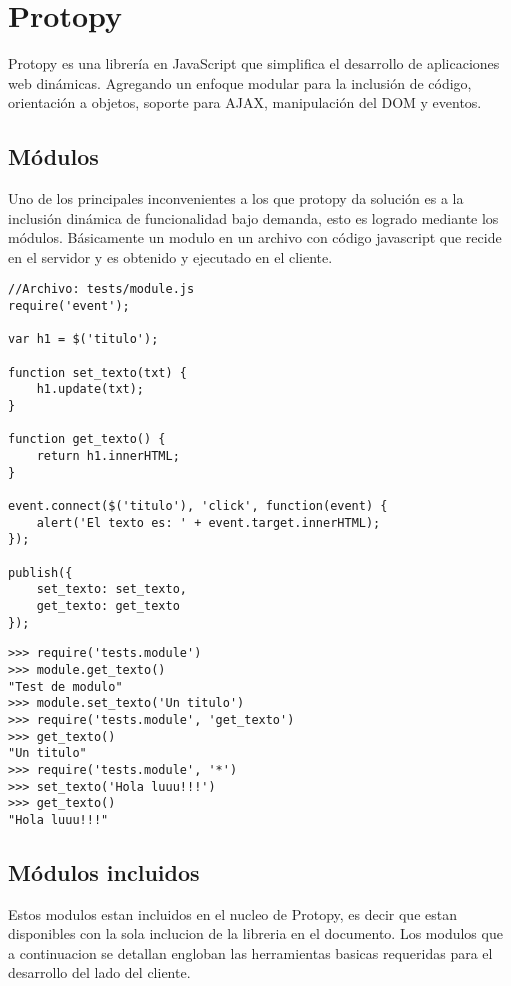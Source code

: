 \chapter{Protopy}
Protopy es una librería en JavaScript que simplifica el desarrollo de
aplicaciones web dinámicas.
Agregando un enfoque modular para la inclusión de código, orientación a objetos,
soporte para AJAX, manipulación del DOM y eventos.

\section{Módulos}
Uno de los principales inconvenientes a los que protopy da solución es a la
inclusión dinámica de funcionalidad bajo demanda,
esto es logrado mediante los módulos.
Básicamente un modulo en un archivo con código javascript que recide en el
servidor y es obtenido y ejecutado en el cliente.

\begin{lstlisting}[style=javascript,label=estructura-modulo,caption=Estructura
de un modulo]
//Archivo: tests/module.js
require('event');

var h1 = $('titulo');

function set_texto(txt) {
    h1.update(txt);
}

function get_texto() {
    return h1.innerHTML;
}

event.connect($('titulo'), 'click', function(event) {
    alert('El texto es: ' + event.target.innerHTML);
});

publish({
    set_texto: set_texto,
    get_texto: get_texto
});
\end{lstlisting}

\begin{lstlisting}[style=consola]
>>> require('tests.module')
>>> module.get_texto()
"Test de modulo"
>>> module.set_texto('Un titulo')
>>> require('tests.module', 'get_texto')
>>> get_texto()
"Un titulo"
>>> require('tests.module', '*')
>>> set_texto('Hola luuu!!!')
>>> get_texto()
"Hola luuu!!!"
\end{lstlisting}

\section{Módulos incluidos}
Estos modulos estan incluidos en el nucleo de Protopy, es decir que estan disponibles con la sola inclucion de la libreria en el documento.
Los modulos que a continuacion se detallan engloban las herramientas basicas requeridas para el desarrollo del lado del cliente.
